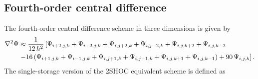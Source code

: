 \documentclass{article}
\begin{document}
\subsection{Fourth-order central difference}
\label{s:3d2shocstb}
The fourth-order central difference scheme in three dimensions is given by 
\begin{alignat}{2}
\label{3dnonhoc}
\nabla^2 \Psi &\approx \frac{1}{12\,h^2}\left[\Psi_{i+2,j,k} + \Psi_{i-2,j,k} + \Psi_{i,j+2,k} + \Psi_{i,j-2,k} + \Psi_{i,j,k+2} + \Psi_{i,j,k-2}\right. \\
\; &\left. - 16\,(\Psi_{i+1,j,k} + \Psi_{i-1,j,k} + \Psi_{i,j+1,k} + \Psi_{i,j-1,k} + \Psi_{i,j,k+1} + \Psi_{i,j,k-1}) + 90\,\Psi_{i,j,k}\right]. \notag
\end{alignat}
The single-storage version of the 2SHOC equivalent scheme is defined as \cite{ME_2SHOC}
\end{document}
